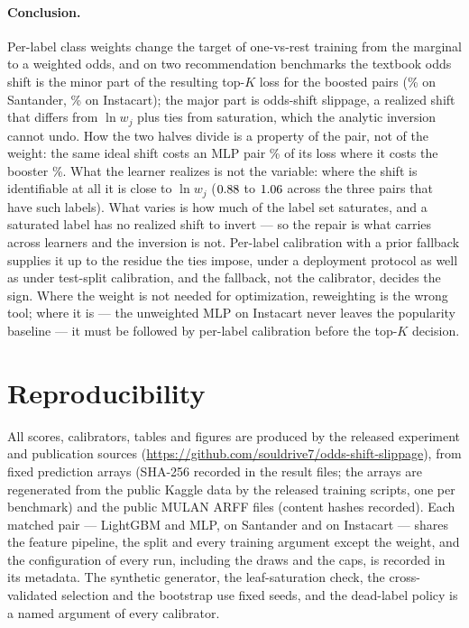 \documentclass[sigconf,nonacm]{acmart}
\begin{document}
\paragraph{Conclusion.} Per-label class weights change the target of one-vs-rest training from the marginal to a weighted odds, and on two recommendation benchmarks the textbook odds shift is the minor part of the resulting top-$K$ loss for the boosted pairs (\noddsShare\% on Santander, \nIoddsShare\% on Instacart); the major part is odds-shift slippage, a realized shift that differs from $\ln w_j$ plus ties from saturation, which the analytic inversion cannot undo. How the two halves divide is a property of the pair, not of the weight: the same ideal shift costs an MLP pair \nModdsShare\% of its loss where it costs the booster \noddsShare\%. What the learner realizes is not the variable: where the shift is identifiable at all it is close to $\ln w_j$ ($0.88$ to $1.06$ across the three pairs that have such labels). What varies is how much of the label set saturates, and a saturated label has no realized shift to invert --- so the repair is what carries across learners and the inversion is not. Per-label calibration with a prior fallback supplies it up to the residue the ties impose, under a deployment protocol as well as under test-split calibration, and the fallback, not the calibrator, decides the sign. Where the weight is not needed for optimization, reweighting is the wrong tool; where it is --- the unweighted MLP on Instacart never leaves the popularity baseline --- it must be followed by per-label calibration before the top-$K$ decision.

\section*{Reproducibility}
All scores, calibrators, tables and figures are produced by the released experiment and publication sources (\url{https://github.com/souldrive7/odds-shift-slippage}), from fixed prediction arrays (SHA-256 recorded in the result files; the arrays are regenerated from the public Kaggle data by the released training scripts, one per benchmark) and the public MULAN ARFF files (content hashes recorded). Each matched pair --- LightGBM and MLP, on Santander and on Instacart --- shares the feature pipeline, the split and every training argument except the weight, and the configuration of every run, including the \nseedN{} draws and the \ncapN{} caps, is recorded in its metadata. The synthetic generator, the leaf-saturation check, the cross-validated selection and the bootstrap use fixed seeds, and the dead-label policy is a named argument of every calibrator.
\end{document}
